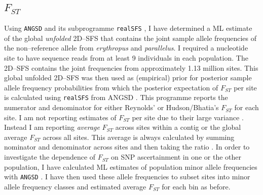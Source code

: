 \documentclass[a4paper,12pt,times,print,index,custombib,custommargin]{PhDThesisPSnPDF}\usepackage[]{graphicx}\usepackage[]{color}
\begin{document}
\subsection{$F_{ST}$}
%
%
Using \texttt{ANGSD} and its subprogramme \texttt{realSFS} \citep{Korneliussen2014}, I have determined a ML estimate of the global \emph{unfolded} 2D--\gls{SFS} that contains the joint sample allele frequencies of the non--reference allele from \textit{erythropus} and \textit{parallelus}. I required a nucleotide site to have sequence reads from at least 9 individuals in each population. The 2D--SFS contains the joint frequencies from approximately 1.13 million sites. This global unfolded 2D--\gls{SFS} was then used as (empirical) prior for posterior sample allele frequency probabilities from which the posterior expectation of $F_{ST}$ per site is calculated using \texttt{realSFS} from ANGSD \citep{Fumagalli2013}. This programme reports the numerator and denominator for either Reynolds' \citep[eq. 3]{Fumagalli2013} or Hudson/Bhatia's $F_{ST}$ \citep[eq. 9 and 10]{Bhatia2013} for each site. I am not reporting estimates of $F_{ST}$ per site due to their large variance \citep{Weir2005}. Instead I am reporting \emph{average} $F_{ST}$ across sites within a contig or the global average $F_{ST}$ across all sites. This average is always calculated by summing nominator and denominator across sites and then taking the ratio \citep{Bhatia2013}.
In order to investigate the dependence of $F_{ST}$ on SNP ascertainment in one or the other population, I have calculated ML estimates of population minor allele frequencies with \texttt{ANGSD} \citep{Kim2011}. I have then used these allele frequencies to subset sites into minor allele frequency classes and estimated average $F_{ST}$ for each bin as before.
%
%
\end{document}
